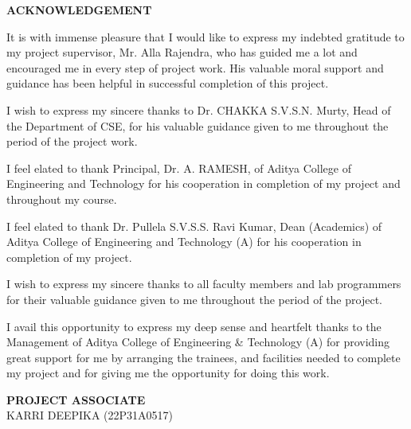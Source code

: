 \begin{center}
{\bfseries\fontsize{16}{18}\selectfont ACKNOWLEDGEMENT}
\end{center}

\vspace{0.5cm}
\noindent
It is with immense pleasure that I would like to express my indebted gratitude to my project supervisor,
Mr. Alla Rajendra, who has guided me a lot and encouraged me in every step of project work.
His valuable moral support and guidance has been helpful in successful completion of this project.

\vspace{0.3cm}

\noindent
I wish to express my sincere thanks to Dr. CHAKKA S.V.S.N. Murty, Head of the Department of CSE,
for his valuable guidance given to me throughout the period of the project work.

\vspace{0.3cm}

\noindent
I feel elated to thank Principal, Dr. A. RAMESH, of Aditya College of Engineering and Technology
for his cooperation in completion of my project and throughout my course.

\vspace{0.3cm}

\noindent
I feel elated to thank Dr. Pullela S.V.S.S. Ravi Kumar, Dean (Academics) of Aditya College of Engineering and Technology (A)
for his cooperation in completion of my project.

\vspace{0.3cm}

\noindent
I wish to express my sincere thanks to all faculty members and lab programmers for their valuable guidance
given to me throughout the period of the project.

\vspace{0.3cm}

\noindent
I avail this opportunity to express my deep sense and heartfelt thanks to the Management of
Aditya College of Engineering \& Technology (A) for providing great support for me by arranging the trainees,
and facilities needed to complete my project and for giving me the opportunity for doing this work.

\vspace{2cm}

\begin{flushright}
\textbf{PROJECT ASSOCIATE}\\[0.5cm]

KARRI DEEPIKA (22P31A0517)
\end{flushright}